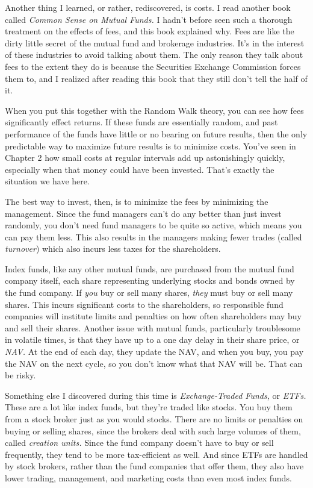 Another thing I learned, or rather, rediscovered, is costs. I read another book called \emph{Common Sense on Mutual Funds.} I hadn't before seen such a thorough treatment on the effects of fees, and this book explained why. Fees are like the dirty little secret of the mutual fund and brokerage industries. It's in the interest of these industries to avoid talking about them. The only reason they talk about fees to the extent they do is because the Securities Exchange Commission forces them to, and I realized after reading this book that they still don't tell the half of it.

When you put this together with the Random Walk theory, you can see how fees significantly effect returns. If these funds are essentially random, and past performance of the funds have little or no bearing on future results, then the only predictable way to maximize future results is to minimize costs. You've seen in Chapter 2 how small costs at regular intervals add up astonishingly quickly, especially when that money could have been invested. That's exactly the situation we have here.

The best way to invest, then, is to minimize the fees by minimizing the management. Since the fund managers can't do any better than just invest randomly, you don't need fund managers to be quite so active, which means you can pay them less. This also results in the managers making fewer trades (called \emph{turnover}) which also incurs less taxes for the shareholders.

Index funds, like any other mutual funds, are purchased from the mutual fund company itself, each share representing underlying stocks and bonds owned by the fund company. If \emph{you} buy or sell many shares, \emph{they} must buy or sell many shares. This incurs significant costs to the shareholders, so responsible fund companies will institute limits and penalties on how often shareholders may buy and sell their shares. Another issue with mutual funds, particularly troublesome in volatile times, is that they have up to a one day delay in their share price, or \emph{NAV.} At the end of each day, they update the NAV, and when you buy, you pay the NAV on the next cycle, so you don't know what that NAV will be. That can be risky.

Something else I discovered during this time is \emph{Exchange-Traded Funds,} or \emph{ETFs.} These are a lot like index funds, but they're traded like stocks. You buy them from a stock broker just as you would stocks. There are no limits or penalties on buying or selling shares, since the brokers deal with such large volumes of them, called \emph{creation units.} Since the fund company doesn't have to buy or sell frequently, they tend to be more tax-efficient as well. And since ETFs are handled by stock brokers, rather than the fund companies that offer them, they also have lower trading, management, and marketing costs than even most index funds.

